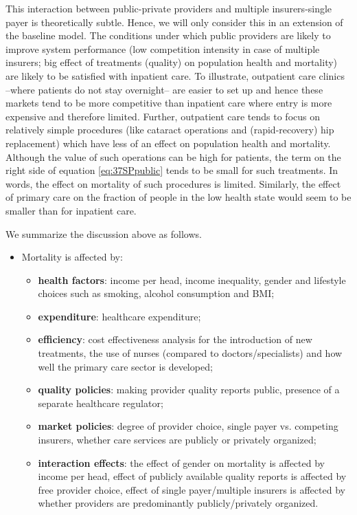 \documentclass[a4paper,12pt]{article}
\begin{document}
This interaction between public-private providers and multiple insurers-single payer is theoretically subtle. Hence, we will only consider this in an extension of the baseline model. The conditions under which public providers are likely to improve system performance (low competition intensity in case of multiple insurers; big effect of treatments (quality) on population health and mortality) are likely to be satisfied with inpatient care. To illustrate, outpatient care clinics --where patients do not stay overnight-- are easier to set up and hence these markets tend to be more competitive than inpatient care where entry is more expensive and therefore limited. Further, outpatient care tends to focus on relatively simple procedures (like cataract operations and (rapid-recovery) hip replacement) which have less of an effect on population health and mortality. Although the value of such operations can be high for patients, the term on the right side of equation \eqref{eq:37SPpublic} tends to be small for such treatments. In words, the effect on mortality of such procedures is limited. Similarly, the effect of primary care on the fraction of people in the low health state would seem to be smaller than for inpatient care.

We summarize the discussion above as follows.

\begin{itemize}
\item Mortality is affected by:
\begin{itemize}
\item \textbf{health factors}:  income per head, income inequality, gender and lifestyle choices such as smoking, alcohol consumption and BMI;
\item \textbf{expenditure}: healthcare expenditure;
\item \textbf{efficiency}: cost effectiveness analysis for the introduction of new treatments, the use of nurses (compared to doctors/specialists) and how well the primary care sector is developed;
\item \textbf{quality policies}: making provider quality reports public, presence of a separate healthcare regulator;
\item \textbf{market policies}: degree of provider choice, single payer vs. competing insurers, whether care services are publicly or privately organized;
\item \textbf{interaction effects}: the effect of gender on mortality is affected by income per head, effect of publicly available quality reports is affected by free provider choice, effect of single payer/multiple insurers is affected by whether providers are predominantly publicly/privately organized.
\end{itemize}
\end{itemize}
\end{document}
